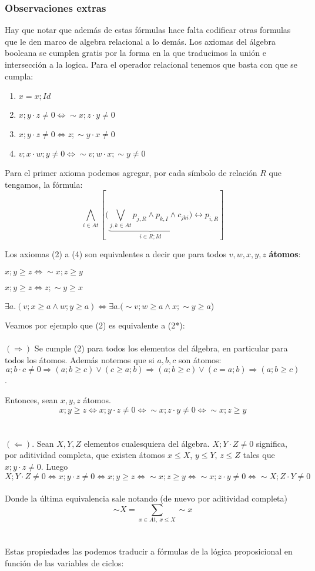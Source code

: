 \documentclass{article}
\theoremstyle{definition}
\newenvironment{modenumerate}
  {\enumerate\setupmodenumerate}
  {\endenumerate}
\newif\ifmoditem
\newcommand{\setupmodenumerate}{%
  \global\moditemfalse
  \let\origmakelabel\makelabel
  \def\moditem##1{\global\moditemtrue\def\mesymbol{##1}\item}%
  \def\makelabel##1{%
    \origmakelabel{##1\ifmoditem\rlap{\mesymbol}\fi\enspace}%
    \global\moditemfalse}%
}
\begin{document}
\subsubsection*{Observaciones extras}
Hay que notar que además de estas fórmulas hace falta codificar otras formulas que le den marco de algebra relacional a lo demás. Los axiomas del álgebra booleana se cumplen gratis por la forma en la que traducimos la unión e intersección a la logica. Para el operador relacional tenemos que basta con que se cumpla:  
\begin{enumerate}
    \item $x = x;Id$   
    \item $x;y \cdot z \neq 0 \Leftrightarrow \sim x ; z \cdot y \neq 0$ 
    \item $x;y \cdot z \neq 0 \Leftrightarrow z ; \sim y \cdot x \neq 0$ 
    \item $v;x \cdot w;y \neq 0 \Leftrightarrow \sim v;w \cdot x;\sim y \neq 0$
\end{enumerate}

Para el primer axioma podemos agregar, por cada símbolo de relación $R$ que tengamos, la fórmula:
\[
    \bigwedge_{i \in At} [(\underbrace{\bigvee_{j,k \in At} p_{j,R} \land p_{k,I} \land c_{jki})}_{i \in R;Id } \leftrightarrow p_{i, R}]
\]

Los axiomas (2) a (4) son equivalentes a decir que para todos $v,w,x,y,z$ \textbf{átomos}:

\begin{modenumerate}
\setcounter{enumi}{1}
    \moditem{*} $x;y \geq z \Leftrightarrow \sim x ; z \geq y$ 
    \moditem{*} $x;y \geq z \Leftrightarrow z ; \sim y \geq x$ 
    \moditem{*} $\exists a. (v;x \geq a \land w;y \geq a) \Leftrightarrow \exists a. (\sim v;w \geq a \land x;\sim y \geq a$)
\end{modenumerate}

Veamos por ejemplo que (2) es equivalente a (2*): \\
\\
$(\Rightarrow)$ Se cumple (2) para todos los elementos del álgebra, en particular para todos los átomos. Además notemos que si $a, b, c$ son átomos:
\[ a;b \cdot c \neq 0 \Rightarrow (a;b \geq c) \vee (c \geq a;b) \Rightarrow (a;b \geq c) \vee (c = a;b)  \Rightarrow (a;b \geq c) \].

Entonces, sean $x,y,z$ átomos.
\[ 
    x;y \geq z \iff x;y \cdot z \neq 0 \iff \sim x;z \cdot y \neq 0 \iff \sim x;z \geq y
\]
\\ 
\\
$(\Leftarrow)$. Sean $X, Y, Z$ elementos cualesquiera del álgebra.
$X;Y \cdot Z \neq 0$ significa, por aditividad completa, que existen átomos $x \leq X$, $y \leq Y$, $z \leq Z$ tales que $x;y \cdot z \neq 0$.
Luego 
\[ X;Y \cdot Z \neq 0 \iff x;y\cdot z \neq 0 \iff x;y \geq z \iff \sim x ; z \geq y \iff \sim x ; z \cdot y \neq 0 \iff \sim X ; Z \cdot Y \neq 0\] 
\\
Donde la última equivalencia sale notando (de nuevo por aditividad completa) \[\sim X = \sum_{x \in At,\ x \leq X} \sim x \]
\\
\\
Estas propiedades las podemos traducir a fórmulas de la lógica proposicional en función de las variables de ciclos:
\end{document}

